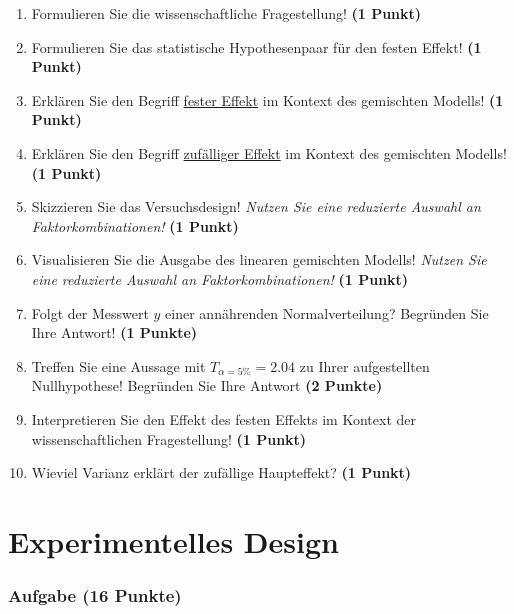 \documentclass[a4paper, 9pt]{scrartcl}\usepackage[]{graphicx}\usepackage[]{xcolor}
\begin{document}
\begin{enumerate}
  \item Formulieren Sie die wissenschaftliche Fragestellung! \textbf{(1 Punkt)}
  \item Formulieren Sie das statistische Hypothesenpaar für den festen Effekt! \textbf{(1 Punkt)}
  \item Erklären Sie den Begriff \underline{fester Effekt} im Kontext des gemischten Modells! \textbf{(1 Punkt)}
  \item Erklären Sie den Begriff \underline{zufälliger Effekt} im Kontext des gemischten Modells! \textbf{(1 Punkt)}
  \item Skizzieren Sie das Versuchsdesign! \textit{Nutzen Sie eine reduzierte Auswahl an Faktorkombinationen!} \textbf{(1 Punkt)} 
  \item Visualisieren Sie die Ausgabe des linearen gemischten Modells! \textit{Nutzen Sie eine reduzierte Auswahl an Faktorkombinationen!} \textbf{(1 Punkt)} 
  \item Folgt der Messwert $y$ einer annährenden Normalverteilung? Begründen Sie Ihre Antwort! \textbf{(1 Punkte)}
\item Treffen Sie eine Aussage mit $T_{\alpha = 5\%} = 2.04$ zu Ihrer aufgestellten Nullhypothese! Begründen Sie Ihre Antwort \textbf{(2 Punkte)}
\item Interpretieren Sie den Effekt des festen Effekts im Kontext der wissenschaftlichen Fragestellung! \textbf{(1 Punkt)}
\item Wieviel Varianz erklärt der zufällige Haupteffekt? \textbf{(1 Punkt)}
\end{enumerate} 
\clearpage
\part{Experimentelles Design}

\section{Aufgabe \hfill (16 Punkte)}
\end{document}

